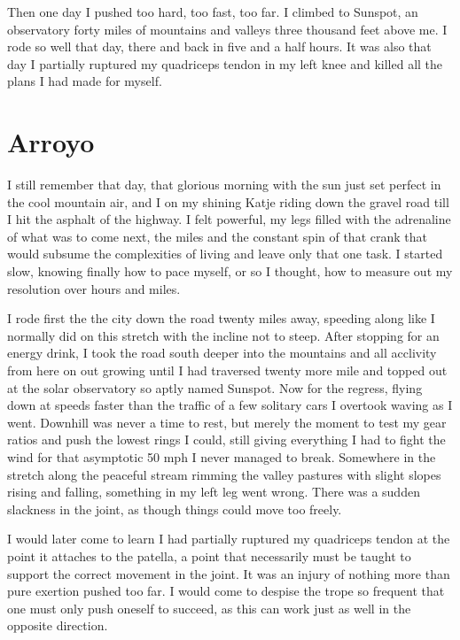 \documentclass[ebook, 10pt, openright, onecolumn]{memoir}
\begin{document}
Then one day I pushed too hard, too fast, too far.  I climbed to Sunspot, an
observatory forty miles of mountains and valleys three thousand feet above me.
I rode so well that day, there and back in five and a half hours. It was also
that day I partially ruptured my quadriceps tendon in my left knee and killed
all the plans I had made for myself.


\chapter{Arroyo}
\label{cha:arroyo}

I still remember that day, that glorious morning with the sun just set perfect
in the cool mountain air, and I on my shining Katje riding down the gravel road
till I hit the asphalt of the highway.  I felt powerful, my legs filled with the
adrenaline of what was to come next, the miles and the constant spin of that
crank that would subsume the complexities of living and leave only that one
task.  I started slow, knowing finally how to pace myself, or so I thought, how
to measure out my resolution over hours and miles.

I rode first the the city down the road twenty miles away, speeding along like I
normally did on this stretch with the incline not to steep.  After stopping for
an energy drink, I took the road south deeper into the mountains and all
acclivity from here on out growing until I had traversed twenty more mile and
topped out at the solar observatory so aptly named Sunspot.  Now for the
regress, flying down at speeds faster than the traffic of a few solitary cars I
overtook waving as I went.  Downhill was never a time to rest, but merely the
moment to test my gear ratios and push the lowest rings I could, still giving
everything I had to fight the wind for that asymptotic 50 mph I never managed to
break.  Somewhere in the stretch along the peaceful stream rimming the valley
pastures with slight slopes rising and falling, something in my left leg went
wrong.  There was a sudden slackness in the joint, as though things could move
too freely.

I would later come to learn I had partially ruptured my quadriceps tendon at the
point it attaches to the patella, a point that necessarily must be taught to
support the correct movement in the joint.  It was an injury of nothing more
than pure exertion pushed too far.  I would come to despise the trope so
frequent that one must only push oneself to succeed, as this can work just as
well in the opposite direction.
\end{document}
